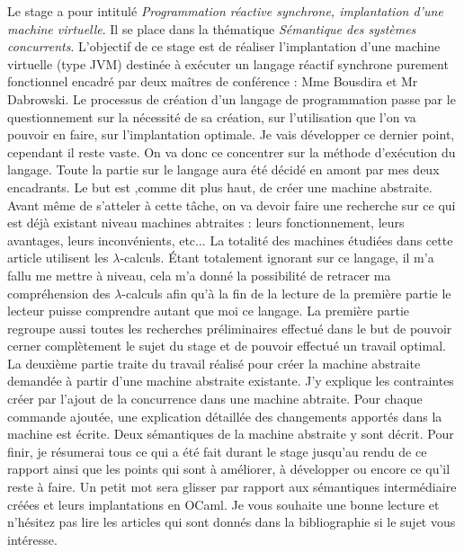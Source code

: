 \documentclass[10pt,a4paper]{article}
\begin{document}
		Le stage a pour intitulé \textit{Programmation réactive synchrone, implantation d’une machine virtuelle}. Il se place dans la thématique \textit{Sémantique des systèmes concurrents}. L’objectif de ce stage est de réaliser l’implantation d’une machine virtuelle (type JVM) destinée à exécuter un langage réactif synchrone purement fonctionnel encadré par deux maîtres de conférence : Mme Bousdira et Mr Dabrowski.
		\smallbreak
		Le processus de création d'un langage de programmation passe par le questionnement sur la nécessité de sa création, sur l'utilisation que l'on va pouvoir en faire, sur l'implantation optimale. Je vais développer ce dernier point, cependant il reste vaste. On va donc ce concentrer sur la méthode d'exécution du langage. Toute la partie sur le langage aura été décidé en amont par mes deux encadrants.
		\smallbreak
	    Le but est ,comme dit plus haut, de créer une machine abstraite. Avant même de s'atteler à cette tâche, on va devoir faire une recherche sur ce qui est déjà existant niveau machines abtraites : leurs fonctionnement, leurs avantages, leurs inconvénients, etc... La totalité des machines étudiées dans cette article utilisent les $\lambda$-calculs. Étant totalement ignorant sur ce langage, il m'a fallu me mettre à niveau, cela m'a donné la possibilité de retracer ma compréhension des $\lambda$-calculs afin qu'à la fin de la lecture de la première partie le lecteur puisse comprendre autant que moi ce langage. La première partie regroupe aussi toutes les recherches préliminaires effectué dans le but de pouvoir cerner complètement le sujet du stage et de pouvoir effectué un travail optimal.
		\smallbreak
		La deuxième partie traite du travail réalisé pour créer la machine abstraite demandée à partir d'une machine abstraite existante. J'y explique les contraintes créer par l'ajout de la concurrence dans une machine abtraite. Pour chaque commande ajoutée, une explication détaillée des changements apportés dans la machine est écrite. Deux sémantiques de la machine abstraite y sont décrit.
		\smallbreak
		Pour finir, je résumerai tous ce qui a été fait durant le stage jusqu'au rendu de ce rapport ainsi que les points qui sont à améliorer, à développer ou encore ce qu'il reste à faire. Un petit mot sera glisser par rapport aux sémantiques intermédiaire créées et leurs implantations en OCaml. 
		\smallbreak
		Je vous souhaite une bonne lecture et n'hésitez pas lire les articles qui sont donnés dans la bibliographie si le sujet vous intéresse.
		\newpage
		
		
	
\end{document}
